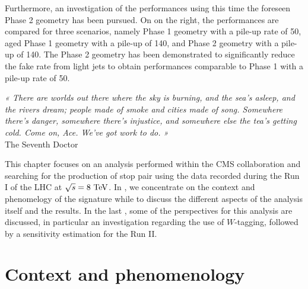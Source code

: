     Furthermore, an investigation of the performances using this time the foreseen Phase 2
    geometry has been pursued. On  on the right, the
    performances are compared for three scenarios, namely Phase 1 geometry with a pile-up
    rate of 50, aged Phase 1 geometry with a pile-up of 140, and Phase 2 geometry with
    a pile-up of 140. The Phase 2 geometry has been demonstrated to significantly reduce
    the fake rate from light jets to obtain performances comparable to Phase 1 with a
    pile-up rate of 50.

\setcounter{mtc}{5}
\vspace*{-0.7cm}
\begin{center}
\begin{minipage}{0.95\textwidth}
\emph{« There are worlds out there where the sky is burning, and the sea’s asleep, and the rivers dream;
people made of smoke and cities made of song. Somewhere there’s danger, somewhere there’s injustice,
and somewhere else the tea’s getting cold. Come on, Ace. We’ve got work to do. »}\\
\hspace*{0.75\textwidth} The Seventh Doctor
\end{minipage}
\end{center}

\minitoc
\newpage

    This chapter focuses on an analysis performed within the CMS collaboration
    and searching for the production of stop pair using the data recorded during
    the Run I of the LHC at $\sqrt{s} = 8~\text{TeV}$. In ,
    we concentrate on the context and phenomelogy of the signature while
     to  discuss
    the different aspects of the analysis itself and the results. In the last
    , some of the perspectives for this analysis
    are discussed, in particular an investigation regarding the use of $W$-tagging, followed
    by a sensitivity estimation for the Run II.

    \section{Context and phenomenology \label{sec:analysis_contextAndPheno}}

